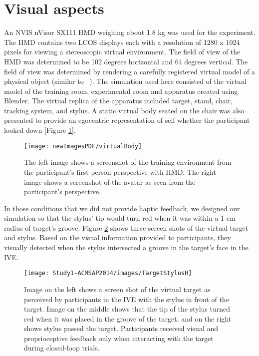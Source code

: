 \section{Visual aspects}

An NVIS nVisor SX111 HMD weighing about 1.8 kg was used for the experiment. The HMD contains two LCOS displays each with a resolution of 1280 x 1024 pixels for viewing a stereoscopic virtual environment. The field of view of the HMD was determined to be 102 degrees horizontal and 64 degrees vertical. The field of view was determined by rendering a carefully registered virtual model of a physical object (similar to ~\cite{NAB+11}). The simulation used here consisted of the virtual model of the training room, experimental room and apparatus created using Blender. The virtual replica of the apparatus included target, stand, chair, tracking system, and stylus. A static virtual body seated on the chair was also presented to provide an egocentric representation of self whether the participant looked down [Figure \ref{fig:virtualBody}].

\begin{figure}[th!]
	\centering
	\texttt{[image: newImagesPDF/virtualBody]}
	\caption{The left image shows a screenshot of the training environment from the participant’s first person perspective with HMD. The right image shows a screenshot of the avatar as seen from the participant’s perspective.}
	\label{fig:virtualBody}
	
\end{figure}

In those conditions that we did not provide haptic feedback, we designed our simulation so that the stylus' tip would turn red when it was within a 1 cm radius of target's groove. Figure \ref{fig:Target_Stylus} shows three screen shots of the virtual target and stylus. Based on the visual information provided to participants, they visually detected when the stylus intersected a groove in the target's face in the IVE.

\begin{figure}[th!]
	\centering
	\texttt{[image: Study1-ACMSAP2014/images/TargetStylusH]}
	\caption{Image on the left shows a screen shot of the virtual target as perceived by participants in the IVE with the stylus in front of the target. Image on the middle shows that the tip of the stylus turned red when it was placed in the groove of the target, and on the right shows stylus passed the target. Participants received visual and proprioceptive feedback only when interacting with the target during closed-loop trials.}
	\label{fig:Target_Stylus}
	
\end{figure}

